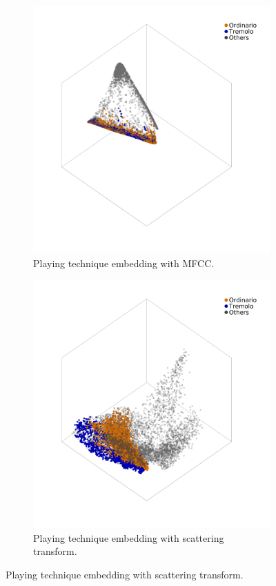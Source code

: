 \begin{figure}
        \begin{subfigure}{0.45\textwidth}
                \centering
                \includegraphics[width=\linewidth]{mf_tech_two_dmap.png}
                \caption{Playing technique embedding with MFCC.}
                \label{fig:mf_tech_two_dmap}
        \end{subfigure}%
        \begin{subfigure}{0.45\textwidth}
                \centering
                \includegraphics[width=\linewidth]{sc_tech_two_dmap.png}
                \caption{Playing technique embedding with scattering transform.}
                \label{fig:sc_tech_two_dmap}
        \end{subfigure}%


\end{figure}
